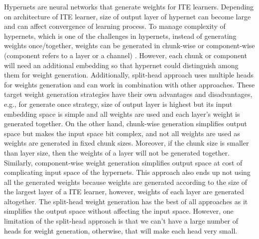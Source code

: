\documentclass{article}
\begin{document}
Hypernets are neural networks that generate weights for ITE learners. Depending on architecture of ITE learner, size of output layer of hypernet can become large and can affect convergence of learning process. To manage complexity of hypernets, which is one of the challenges in hypernets, instead of generating weights once/together, weights can be generated in chunk-wise or component-wise (component refers to a layer or a channel) \cite{Oswald2020Continual}. However, each chunk or component will need an additional embedding so that hypernet could distinguish among them for weight generation. Additionally, split-head approach uses multiple heads for weights generation and can work in combination with other approaches. These target weight generation strategies have their own advantages and disadvantages, e.g., for generate once strategy, size of output layer is highest but its input embedding space is simple and all weights are used and each layer's weight is generated together. On the other hand, chunk-wise generation simplifies output space but makes the input space bit complex, and not all weights are used as weights are generated in fixed chunk sizes. Moreover, if the chunk size is smaller than layer size, then the weights of a layer will not be generated together. Similarly, component-wise weight generation simplifies output space at cost of complicating input space of the hypernets. This approach also ends up not using all the generated weights because weights are generated according to the size of the largest layer of a ITE learner, however, weights of each layer are generated altogether. The split-head weight generation has the best of all approaches as it simplifies the output space without affecting the input space. However, one limitation of the split-head approach is that we can't have a large number of heads for weight generation, otherwise, that will make each head very small.
\end{document}
